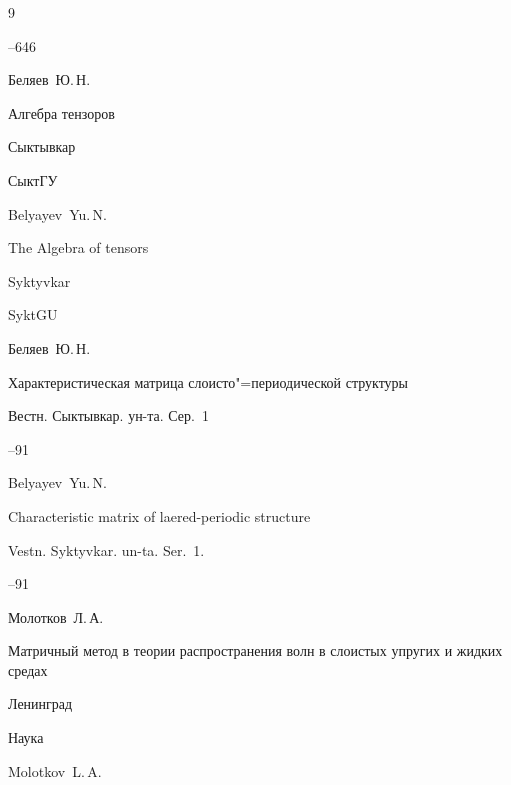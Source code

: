 \begin{thebibliography}{9}


--646




\by Беляев~Ю.\,Н.

\book Алгебра тензоров 

\publaddr Сыктывкар

\publ СыктГУ



\misctransl

\by Belyayev~Yu.\,N.

\book The Algebra of tensors

\publaddr Syktyvkar

\publ SyktGU






\by Беляев~Ю.\,Н.

\paper Характеристическая матрица слоисто"=периодической структуры 

\jour Вестн. Сыктывкар. ун-та. Сер.~1



--91

\misctransl

\by Belyayev~Yu.\,N.

\paper Characteristic matrix of laered-periodic structure

\jour Vestn. Syktyvkar. un-ta. Ser.~1.



--91




\by Молотков~Л.\,А.

\book Матричный метод в теории распространения волн в слоистых упругих и жидких средах 

\publaddr Ленинград

\publ Наука



\misctransl

\by Molotkov~L.\,A.


\end{thebibliography}
